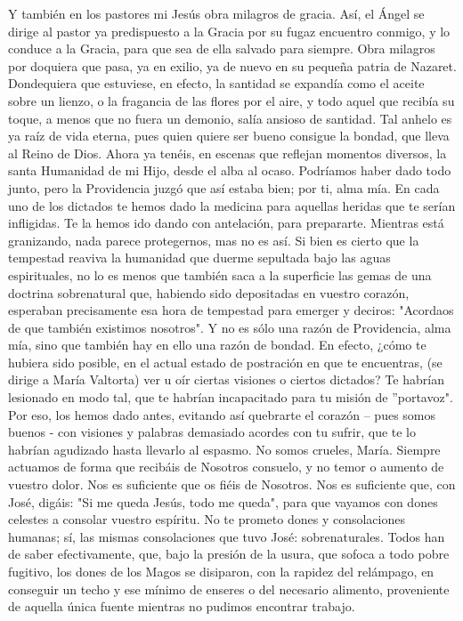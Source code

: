 \documentclass[12pt]{book} %
\begin{document}
Y también en los pastores mi Jesús obra milagros de gracia. Así, el Ángel se dirige al pastor ya predispuesto a la Gracia 
por su fugaz encuentro conmigo, y lo conduce a la Gracia, para que sea de ella salvado para siempre. 
Obra milagros por doquiera que pasa, ya en exilio, ya de nuevo en su pequeña patria de Nazaret. Dondequiera que 
estuviese, en efecto, la santidad se expandía como el aceite sobre un lienzo, o la fragancia de las flores por el aire, y todo aquel que recibía su toque, a menos que no fuera un demonio, salía ansioso de santidad. Tal anhelo es ya raíz de vida eterna, pues quien quiere ser bueno consigue la bondad, que lleva al Reino de Dios. 
Ahora ya tenéis, en escenas que reflejan momentos diversos, la santa Humanidad de mi Hijo, desde el alba al ocaso.  
Podríamos haber dado todo junto, pero la Providencia juzgó que así estaba bien; por ti, alma mía. En cada uno de los 
dictados te hemos dado la medicina para aquellas heridas que te serían infligidas. Te la hemos ido dando con antelación, para prepararte. Mientras está granizando, nada parece protegernos, mas no es así. Si bien es cierto que la tempestad reaviva la humanidad que duerme sepultada bajo las aguas espirituales, no lo es menos que también saca a la superficie las gemas de una doctrina sobrenatural que, habiendo sido depositadas en vuestro corazón, esperaban precisamente esa hora de tempestad para emerger y deciros: "Acordaos de que también existimos nosotros". 
Y no es sólo una razón de Providencia, alma mía, sino que también hay en ello una razón de bondad. En efecto, ¿cómo 
te hubiera sido posible, en el actual estado de postración en que te encuentras, (se dirige a María Valtorta) ver u oír ciertas visiones o ciertos dictados? Te habrían lesionado en modo tal, que te habrían incapacitado para tu misión de ''portavoz". Por eso, los hemos dado antes, evitando así quebrarte el corazón – pues somos buenos - con visiones y palabras demasiado acordes con tu sufrir, que te lo habrían agudizado hasta llevarlo al espasmo. No somos crueles, María. Siempre actuamos de forma que recibáis de Nosotros consuelo, y no temor o aumento de vuestro dolor. Nos es suficiente que os fiéis de Nosotros. Nos es suficiente que, con José, digáis: "Si me queda Jesús, todo me queda", para que vayamos con dones celestes a consolar vuestro espíritu. 
No te prometo dones y consolaciones humanas; sí, las mismas consolaciones que tuvo José: sobrenaturales. Todos han 
de saber efectivamente, que, bajo la presión de la usura, que sofoca a todo pobre fugitivo, los dones de los Magos se disiparon, con la rapidez del relámpago, en conseguir un techo y ese mínimo de enseres o del necesario alimento, proveniente de aquella única fuente mientras no pudimos encontrar trabajo. 
\end{document}
